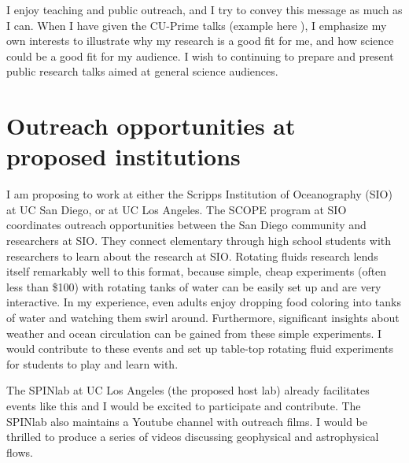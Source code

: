 \documentclass[12pt]{article}
\begin{document}
I enjoy teaching and public outreach, and I try to convey this message as much as I can.
When I have given the CU-Prime talks (example here \cite{jJ22}), I emphasize my own interests to illustrate why my research is a good fit for me, and how science could be a good fit for my audience. I wish to continuing to prepare and present public research talks aimed at general science audiences.
\section*{Outreach opportunities at proposed institutions}
I am proposing to work at either the Scripps Institution of Oceanography (SIO) at UC San Diego, or at UC Los Angeles. The SCOPE program at SIO coordinates outreach opportunities between the San Diego community and researchers at SIO. They connect elementary through high school students with researchers to learn about the research at SIO. 
Rotating fluids research lends itself remarkably well to this format, because simple, cheap experiments (often less than \$100) with rotating tanks of water can be easily set up and are very interactive. In my experience, even adults enjoy dropping food coloring into tanks of water and watching them swirl around. Furthermore, significant insights about weather and ocean circulation can be gained from these simple  experiments. I would contribute to these events and set up table-top rotating fluid experiments for students to play and learn with.

The SPINlab at UC Los Angeles (the proposed host lab) already facilitates events like this and I would be excited to participate and contribute. The SPINlab also maintains a Youtube channel with outreach films. I would be thrilled to produce a series of videos discussing geophysical and astrophysical flows. 
\printbibliography
\end{document}
